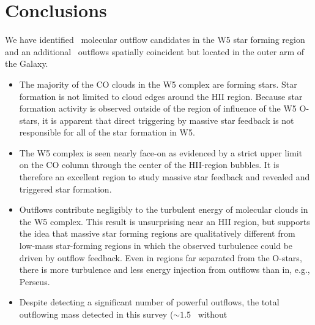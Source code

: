 \section{Conclusions}

We have identified \nwfive\ molecular outflow candidates in the W5 star forming
region and an additional \nouter\ outflows spatially coincident but located in
the outer arm of the Galaxy.  

\begin{itemize}
    \item The majority of the CO clouds in the W5 complex are forming stars.
      Star formation is not limited to cloud edges around the HII region.
      Because star formation activity is observed outside of the region of
      influence of the W5 O-stars, it is apparent that direct triggering by
      massive star feedback is not responsible for all of the star formation in
      W5.
    \item The W5 complex is seen nearly face-on as evidenced by a strict upper
      limit on the CO column through the center of the HII-region bubbles.  It
      is therefore an excellent region to study massive star feedback and
      revealed and triggered star formation.
    \item Outflows contribute negligibly to the turbulent energy of molecular
      clouds in the W5 complex.  This result is unsurprising near an HII
      region, but supports the idea that massive star forming regions are
      qualitatively different from low-mass star-forming regions in which the
      observed turbulence could be driven by outflow feedback.  Even in regions
      far separated from the O-stars, there is more turbulence and less energy
      injection from outflows than in, e.g., Perseus.
    \item Despite detecting a significant number of powerful outflows, the
      total outflowing mass detected in this survey ($\sim 1.5$ \msun\ without

\end{itemize}
